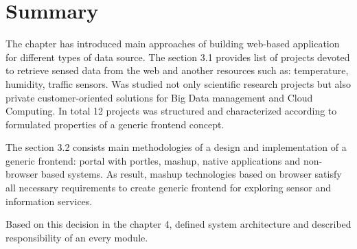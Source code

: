 \section{Summary}
The chapter has introduced main approaches of building web-based application for different types of data source. The section 3.1 provides list of projects devoted to retrieve sensed data from the web and another resources such as: temperature, humidity, traffic sensors. Was studied not only scientific research projects but also private customer-oriented solutions for Big Data management and Cloud Computing. In total 12 projects was structured and characterized according to formulated properties of a generic frontend concept.

The section 3.2 consists main methodologies of a design and implementation of a generic frontend: portal with portles, mashup, native applications and non-browser based systems. As result, mashup technologies based on browser satisfy all necessary requirements to create generic frontend for exploring sensor and information services. 

Based on this decision in the chapter 4, defined system architecture and described responsibility of an every module. 